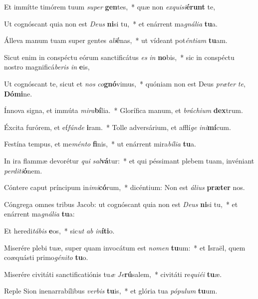 \item Et immítte timórem tuum \textit{su}\textit{per} \textbf{gen}tes,~* quæ non \textit{ex}\textit{qui}\textit{si}\textbf{é}\textbf{runt} te,
\item Ut cognóscant quia non est \textit{De}\textit{us} \textbf{ni}si tu,~* et enárrent ma\textit{gná}\textit{li}\textit{a} \textbf{tu}a.
\item Álleva manum tuam super gentes \textit{a}\textit{li}\textbf{é}nas,~* ut vídeant pot\textit{én}\textit{ti}\textit{am} \textbf{tu}am.
\item Sicut enim in conspéctu eórum sanctificátus \textit{es} \textit{in} \textbf{no}bis,~* sic in conspéctu nostro magnificá\textit{be}\textit{ris} \textit{in} \textbf{e}is,
\item Ut cognóscant te, sicut et \textit{nos} \textit{co}\textbf{gnó}vimus,~* quóniam non est Deus \textit{præ}\textit{ter} \textit{te}, \textbf{Dó}\textbf{mi}ne.
\item Ínnova signa, et immúta \textit{mi}\textit{ra}\textbf{bí}lia.~* Glorífica manum, et \textit{brá}\textit{chi}\textit{um} \textbf{dex}trum.
\item Éxcita furórem, et ef\textit{fún}\textit{de} \textbf{i}ram.~* Tolle adversárium, et afflí\textit{ge} \textit{in}\textit{i}\textbf{mí}cum.
\item Festína tempus, et me\textit{mén}\textit{to} \textbf{fi}nis,~* ut enárrent mira\textit{bí}\textit{li}\textit{a} \textbf{tu}a.
\item In ira flammæ devorétur \textit{qui} \textit{sal}\textbf{vá}tur:~* et qui péssimant plebem tuam, invéniant \textit{per}\textit{di}\textit{ti}\textbf{ó}nem.
\item Cóntere caput príncipum in\textit{i}\textit{mi}\textbf{có}rum,~* dicéntium: Non est \textit{á}\textit{li}\textit{us} \textbf{præ}\textbf{ter} nos.
\item Cóngrega omnes tribus Jacob: ut cognóscant quia non est \textit{De}\textit{us} \textbf{ni}si tu,~* et enárrent ma\textit{gná}\textit{li}\textit{a} \textbf{tu}a:
\item Et heredi\textit{tá}\textit{bis} \textbf{e}os,~* sic\textit{ut} \textit{ab} \textit{in}\textbf{í}\textbf{ti}o.
\item Miserére plebi tuæ, super quam invocátum est \textit{no}\textit{men} \textbf{tu}um:~* et Israël, quem coæquásti primo\textit{gé}\textit{ni}\textit{to} \textbf{tu}o.
\item Miserére civitáti sanctificatiónis tu\textit{æ} \textit{Je}\textbf{rú}salem,~* civitáti re\textit{qui}\textit{é}\textit{i} \textbf{tu}æ.
\item Reple Sion inenarrabílibus \textit{ver}\textit{bis} \textbf{tu}is,~* et glória tua \textit{pó}\textit{pu}\textit{lum} \textbf{tu}um.
